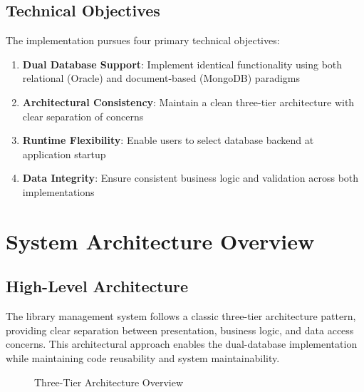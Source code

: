 \documentclass[12pt,a4paper]{article}
\begin{document}
\subsection{Technical Objectives}

The implementation pursues four primary technical objectives:

\begin{enumerate}
    \item \textbf{Dual Database Support}: Implement identical functionality using both relational (Oracle) and document-based (MongoDB) paradigms
    \item \textbf{Architectural Consistency}: Maintain a clean three-tier architecture with clear separation of concerns
    \item \textbf{Runtime Flexibility}: Enable users to select database backend at application startup
    \item \textbf{Data Integrity}: Ensure consistent business logic and validation across both implementations
\end{enumerate}

\section{System Architecture Overview}

\subsection{High-Level Architecture}

The library management system follows a classic three-tier architecture pattern, providing clear separation between presentation, business logic, and data access concerns. This architectural approach enables the dual-database implementation while maintaining code reusability and system maintainability.

\begin{figure}[H]
\centering
{}
\caption{Three-Tier Architecture Overview}
\end{figure}
\end{document}
